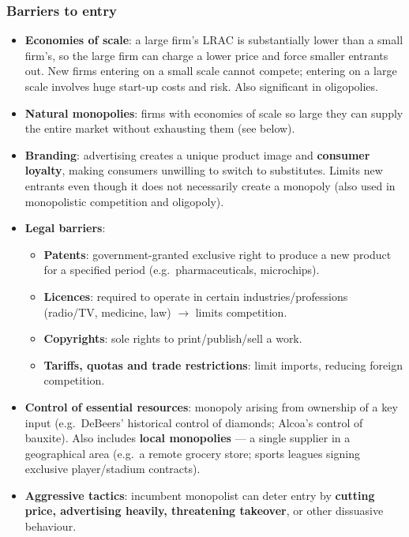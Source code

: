 \documentclass[a4paper,12pt]{article}
\begin{document}
\subsubsection*{Barriers to entry}
\begin{itemize}
  \item \textbf{Economies of scale}: a large firm's LRAC is substantially lower than a small firm's, so the large firm can charge a lower price and force smaller entrants out. New firms entering on a small scale cannot compete; entering on a large scale involves huge start-up costs and risk. Also significant in oligopolies.
  \item \textbf{Natural monopolies}: firms with economies of scale so large they can supply the entire market without exhausting them (see below).
  \item \textbf{Branding}: advertising creates a unique product image and \textbf{consumer loyalty}, making consumers unwilling to switch to substitutes. Limits new entrants even though it does not necessarily create a monopoly (also used in monopolistic competition and oligopoly).
  \item \textbf{Legal barriers}:
  \begin{itemize}
    \item \textbf{Patents}: government-granted exclusive right to produce a new product for a specified period (e.g.\ pharmaceuticals, microchips).
    \item \textbf{Licences}: required to operate in certain industries/professions (radio/TV, medicine, law) $\to$ limits competition.
    \item \textbf{Copyrights}: sole rights to print/publish/sell a work.
    \item \textbf{Tariffs, quotas and trade restrictions}: limit imports, reducing foreign competition.
  \end{itemize}
  \item \textbf{Control of essential resources}: monopoly arising from ownership of a key input (e.g.\ DeBeers' historical control of diamonds; Alcoa's control of bauxite). Also includes \textbf{local monopolies} --- a single supplier in a geographical area (e.g.\ a remote grocery store; sports leagues signing exclusive player/stadium contracts).
  \item \textbf{Aggressive tactics}: incumbent monopolist can deter entry by \textbf{cutting price, advertising heavily, threatening takeover}, or other dissuasive behaviour.
\end{itemize}
\end{document}

